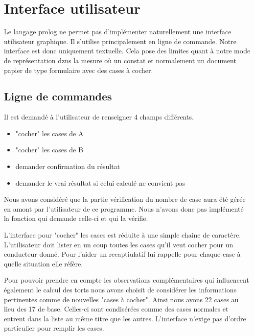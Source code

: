 
\chapter{Interface utilisateur}

Le langage prolog ne permet pas d'implémenter naturellement une interface utilisateur graphique. Il s'utilise principalement en ligne de commande. Notre interface est donc uniquement textuelle. Cela pose des limites quant à notre mode de représentation dzns la mesure où un constat et normalement un document papier de type formulaire avec des cases à cocher.

\section{Ligne de commandes}

Il est demandé à l'utilisateur de renseigner 4 champs différents.
\begin{itemize}
\item "cocher" les cases de A
\item "cocher" les cases de B
\item demander confirmation du résultat
\item demander le vrai résultat si celui calculé ne convient pas
\end{itemize}

\vspace*{7mm}
Nous avons considéré que la partie vérification du nombre de case aura été gérée en amont par l'utilisateur de ce programme. Nous n'avons donc pas implémenté la fonction qui demande celle-ci et qui la vérifie.

L'interface pour "cocher" les cases est réduite à une simple chaine de caractère. L'utilisateur doit lister en un coup toutes les cases qu'il veut cocher pour un conducteur donné. Pour l'aider un recaptiulatif lui rappelle pour chaque case à quelle situation elle réfère.
\newline
\vspace*{7mm}

Pour pouvoir prendre en compte les observations complémentaires qui influencent également le calcul des torts nous avons choisit de considérer les informations pertinentes comme de nouvelles "cases à cocher". Ainsi nous avons 22 cases au lieu des 17 de base.
Celles-ci sont condisérées comme des cases normales et entrent dans la liste au même titre que les autres.
L'interface n'exige pas d'ordre particulier pour remplir les cases.
\newline

